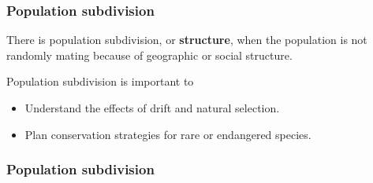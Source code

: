 \documentclass{beamer}
\newcommand{\1}{\ensuremath{\mathbf{1}}}
\begin{document}
%
%
%
\begin{frame}\frametitle{Population subdivision}
	\begin{block}{}
		There is population subdivision, or \textbf{structure}, when the population is not randomly mating because of geographic or social structure.
	\end{block}
	Population subdivision is important to
	\begin{itemize}
		\item Understand the effects of drift and natural selection.
		\item Plan conservation strategies for rare or endangered species.
	\end{itemize}
\end{frame}
%
%
%
\begin{frame}\frametitle{Population subdivision}
	\begin{center}
	\end{center}
\end{frame}
%
%
%
\end{document}

